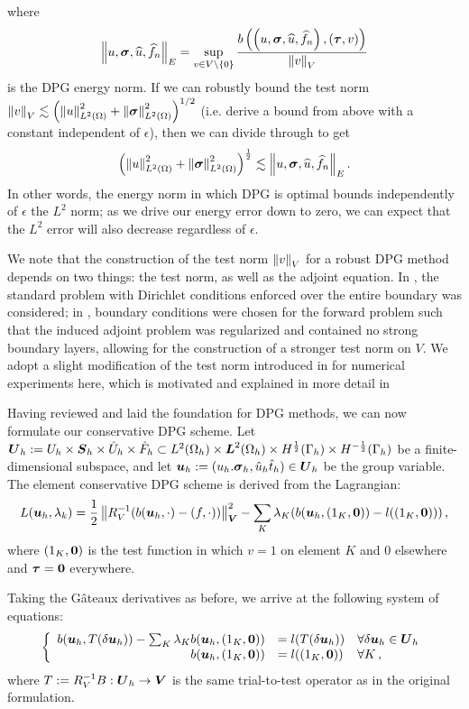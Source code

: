 \documentclass{report}
\begin{document}
where
\[
\left\| u,\boldsymbol\sigma,\widehat{u},\widehat{f}_n \right\|_E = \sup_{v\in
V\setminus\left\{ 0 \right\}}\frac{b\left( \left( u,\boldsymbol\sigma,\widehat{u},\widehat{f}_n \right),\left( \boldsymbol\tau,v \right) \right)}{\left\| v \right\|_V}
\]
is the DPG energy norm.  If we can robustly bound the test norm $\left\| v \right\|_V
\lesssim \left( \left\| u \right\|_{L^2\left( \Omega \right)}^2+\left\| \boldsymbol\sigma \right\|^2_{L^2\left( \Omega \right)} \right)^{1/2}$ (i.e. derive a
bound from above with a constant independent of $\epsilon$), then we can
divide through to get
\begin{equation}
\left( \left\| u \right\|_{L^2\left( \Omega \right)}^2 + \left\| \boldsymbol\sigma \right\|_{L^2\left( \Omega \right)}^2 \right)^{\frac{1}{2}} \lesssim
\left\| u,\boldsymbol\sigma,\widehat{u},\widehat{f}_n \right\|_E.
\label{eq:robustBound}
\end{equation}
In other words, the energy norm in which DPG is optimal bounds independently
of $\epsilon$ the $L^2$ norm; as we drive our energy error down to zero, we
can expect that the $L^2$ error will also decrease regardless of $\epsilon$.

We note that the construction of the test norm $\left\| v \right\|_V$ for a robust DPG
method depends on two things: the test norm, as well as the adjoint equation.
In \cite{DemkowiczHeuer}, the standard problem with Dirichlet conditions
enforced over the entire boundary was considered; in
\cite{ChanHeuerThanhDemkowicz2012}, boundary conditions were chosen for the
forward problem such that the induced adjoint problem was regularized and
contained no strong boundary layers, allowing for the construction of a
stronger test norm on $V$.  We adopt a slight modification of the test norm
introduced in \cite{ChanHeuerThanhDemkowicz2012} for numerical experiments
here, which is motivated and explained in more detail in


Having reviewed and laid the foundation for DPG methods, we can now formulate our conservative DPG scheme.  %
Let $\boldsymbol{U}_h:=U_h\times\boldsymbol{S}_h\times\hat U_h\times\hat F_h\subset L^2(\Omega_h)\times\boldsymbol{L}^2(\Omega_h)\times H^{\frac{1}{2}}(\Gamma_h)\times H^{-\frac{1}{2}}(\Gamma_h)$
be a finite-dimensional subspace, and let $\boldsymbol{u}_h:=(u_h.\boldsymbol\sigma_h,\hat
u_h\hat t_h)\in\boldsymbol{U}_h$ be the group variable. The element conservative DPG scheme is
derived from the Lagrangian:
\begin{equation}
L(\boldsymbol{u}_h,\lambda_k)=\frac{1}{2}\left\| R_V^{-1}(b(\boldsymbol{u}_h,\cdot)-(f,\cdot)) \right\|^2_{\boldsymbol{V}}-\sum_K\lambda_K(b(\boldsymbol{u}_h,(1_K,\boldsymbol{0}))-l((1_K,\boldsymbol{0})))\,,
\label{eq:lagrangian}
\end{equation}
where $(1_K,\boldsymbol{0})$ is the test function in which $v=1$ on element $K$ and 0 elsewhere and $\boldsymbol\tau=\boldsymbol{0}$ everywhere.

Taking the G\^ateaux derivatives as before, we arrive at the following system
of equations:
\begin{equation}
\left\{
\begin{array}[c]{rll}
b(\boldsymbol{u}_h,T(\delta\boldsymbol{u}_h))-\sum_K\lambda_K b(\boldsymbol{u}_h,(1_K,\boldsymbol{0}))
&=l(T(\delta\boldsymbol{u}_h)) & \forall\delta\boldsymbol{u}_h\in\boldsymbol{U}_h\\
b(\boldsymbol{u}_h,(1_K,\boldsymbol{0})) &=l((1_K,\boldsymbol{0})) & \forall K\,,
\end{array}
\right.
\label{eq:conservativeSystem}
\end{equation}
where $T:=R_V^{-1}B:\boldsymbol{U}_h\rightarrow\boldsymbol{V}$ is the same trial-to-test operator as in the original formulation.
\end{document}
